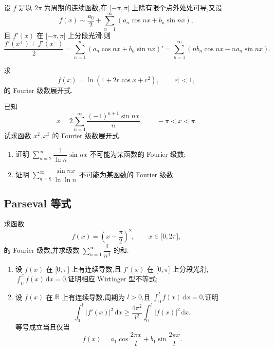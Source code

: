 \documentclass[../数学分析培优讲义.tex]{subfiles}
\begin{document}
\begin{theorem}
设 $f$ 是以 $2\pi$ 为周期的连续函数,在 $\lbrack -\pi,\pi\rbrack$ 上除有限个点外处处可导,又设
\[
    f(x)\sim\dfrac{a_0}{2}+\sum\limits_{n=1}^{\infty}(a_n\cos nx+b_n\sin nx),
\]
且 $f'(x)$ 在 $\lbrack -\pi,\pi\rbrack$ 上分段光滑,则
\[
    \dfrac{f'(x^+)+f'(x^-)}{2}
    =\sum\limits_{n=1}^{\infty}(a_n\cos nx+b_n\sin nx)'
    =\sum\limits_{n=1}^{\infty}(nb_n\cos nx-na_n\sin nx).
\]
\end{theorem}

\begin{example}
求
\[
    f(x)=\ln(1+2r\cos x+r^2),
    \qquad |r|<1,
\]
的 Fourier 级数展开式.
\end{example}
\exampleblank

\begin{example}
已知
\[
    x=2\sum\limits_{n=1}^{\infty}\dfrac{(-1)^{n+1}\sin nx}{n},
    \qquad -\pi<x<\pi.
\]
试求函数 $x^2,x^3$ 的 Fourier 级数展开式.
\end{example}
\exampleblank

\begin{example}
\begin{enumerate}[label=(\arabic*)]
    \item 证明 $\displaystyle\sum\limits_{n=2}^{\infty}\dfrac{1}{\ln n}\sin nx$ 不可能为某函数的 Fourier 级数;
    \item 证明 $\displaystyle\sum\limits_{n=9}^{\infty}\dfrac{\sin nx}{\ln\ln n}$ 不可能为某函数的 Fourier 级数.
\end{enumerate}
\end{example}
\exampleblank


\newpage

\subsection{Parseval 等式}

\begin{example}
求函数
\[
    f(x)=\left(x-\dfrac{\pi}{2}\right)^2,
    \qquad x\in\lbrack 0,2\pi\rbrack,
\]
的 Fourier 级数,并求级数 $\displaystyle\sum\limits_{n=1}^{\infty}\dfrac{1}{n^4}$ 的和.
\end{example}
\exampleblank

\begin{example}
\begin{enumerate}[label=(\arabic*)]
    \item 设 $f(x)$ 在 $\lbrack 0,\pi\rbrack$ 上有连续导数,且 $f'(x)$ 在 $\lbrack 0,\pi\rbrack$ 上分段光滑,$\displaystyle\int_0^\pi f(x)\,\mathrm{d}x=0$.证明相应 Wirtinger 型不等式;
    \item 设 $f(x)$ 在 $\mathbb R$ 上有连续导数,周期为 $l>0$,且 $\displaystyle\int_0^lf(x)\,\mathrm{d}x=0$.证明
    \[
        \int_0^l|f'(x)|^2\,\mathrm{d}x
        \geq\dfrac{4\pi^2}{l^2}\int_0^l|f(x)|^2\,\mathrm{d}x.
    \]
    等号成立当且仅当
    \[
        f(x)=a_1\cos\dfrac{2\pi x}{l}+b_1\sin\dfrac{2\pi x}{l}.
    \]
\end{enumerate}
\end{example}
\exampleblank
\end{document}
